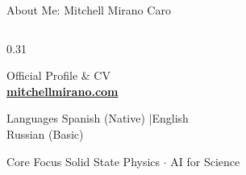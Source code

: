 \documentclass[11pt,aspectratio=169]{beamer}
\begin{document}
\begin{frame}{About Me: Mitchell Mirano Caro}
\begin{columns}[T,onlytextwidth]
    \begin{column}{0.31\textwidth}
      \centering
      \begin{block}{\centering Official Profile \& CV}
        \centering\vspace{0.2em}
        \colorbox{white}{\setlength{\fboxsep}{3pt}\textcolor{black}{}}\\[0.2em]
        \href{https://mitchellmirano.com}{\textbf{\small mitchellmirano.com}}
      \end{block}
      \vspace{0.15em}
      \begin{exampleblock}{\centering Languages}
        \centering \scriptsize
        Spanish (Native) \quad|\quad English\\[0.1em]
        Russian (Basic)
      \end{exampleblock}
      \vspace{0.15em}
      \begin{alertblock}{\centering Core Focus}
        \centering \scriptsize
        Solid State Physics $\cdot$ AI for Science
      \end{alertblock}
    \end{column}
  \end{columns}
\end{frame}
\end{document}
